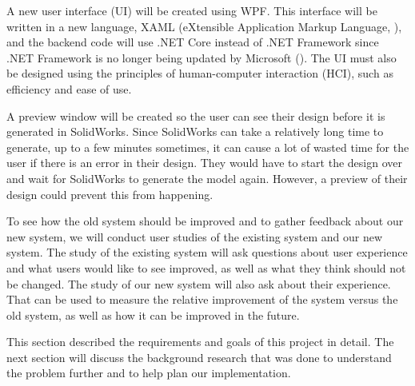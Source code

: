 \begin{doublespace}
A new user interface (UI) will be created using WPF. This interface will be written in a new language, XAML (eXtensible Application Markup Language, \cite{lee_xaml_2020}), and the backend code will use .NET Core instead of .NET Framework since .NET Framework is no longer being updated by Microsoft (\cite{hunter_net_2019}). The UI must also be designed using the principles of human-computer interaction (HCI), such as efficiency and ease of use.

A preview window will be created so the user can see their design before it is generated in SolidWorks. Since SolidWorks can take a relatively long time to generate, up to a few minutes sometimes, it can cause a lot of wasted time for the user if there is an error in their design. They would have to start the design over and wait for SolidWorks to generate the model again. However, a preview of their design could prevent this from happening.

To see how the old system should be improved and to gather feedback about our new system, we will conduct user studies of the existing system and our new system. The study of the existing system will ask questions about user experience and what users would like to see improved, as well as what they think should not be changed. The study of our new system will also ask about their experience. That can be used to measure the relative improvement of the system versus the old system, as well as how it can be improved in the future.

This section described the requirements and goals of this project in detail. The next section will discuss the background research that was done to understand the problem further and to help plan our implementation.

\end{doublespace}